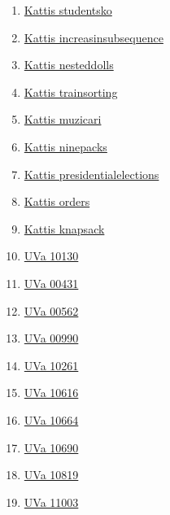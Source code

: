 \begin{enumerate}
\item \href{https://open.kattis.com/problems/studentsko}{Kattis studentsko}
\item \href{https://open.kattis.com/problems/increasinsubsequence}{Kattis increasinsubsequence}
\item \href{https://open.kattis.com/problems/nesteddolls}{Kattis nesteddolls}
\item \href{https://open.kattis.com/problems/trainsorting}{Kattis trainsorting}
\item \href{https://open.kattis.com/problems/muzicari}{Kattis muzicari}
\item \href{https://open.kattis.com/problems/ninepacks}{Kattis ninepacks}
\item \href{https://open.kattis.com/problems/presidentialelections}{Kattis presidentialelections}
\item \href{https://open.kattis.com/problems/orders}{Kattis orders}
\item \href{https://open.kattis.com/problems/knapsack}{Kattis knapsack}
\item \href{https://onlinejudge.org/index.php?option=com_onlinejudge&Itemid=8&page=show_problem&problem=1071}{UVa 10130}
\item \href{https://onlinejudge.org/index.php?option=com_onlinejudge&Itemid=8&page=show_problem&problem=372}{UVa 00431}
\item \href{https://onlinejudge.org/index.php?option=com_onlinejudge&Itemid=8&page=show_problem&problem=503}{UVa 00562}
\item \href{https://onlinejudge.org/index.php?option=com_onlinejudge&Itemid=8&page=show_problem&problem=931}{UVa 00990}
\item \href{https://onlinejudge.org/index.php?option=com_onlinejudge&Itemid=8&page=show_problem&problem=1202}{UVa 10261}
\item \href{https://onlinejudge.org/index.php?option=com_onlinejudge&Itemid=8&page=show_problem&problem=1557}{UVa 10616}
\item \href{https://onlinejudge.org/index.php?option=com_onlinejudge&Itemid=8&page=show_problem&problem=1605}{UVa 10664}
\item \href{https://onlinejudge.org/index.php?option=com_onlinejudge&Itemid=8&page=show_problem&problem=1631}{UVa 10690}
\item \href{https://onlinejudge.org/index.php?option=com_onlinejudge&Itemid=8&page=show_problem&problem=1760}{UVa 10819}
\item \href{https://onlinejudge.org/index.php?option=com_onlinejudge&Itemid=8&page=show_problem&problem=1944}{UVa 11003}

\end{enumerate}

